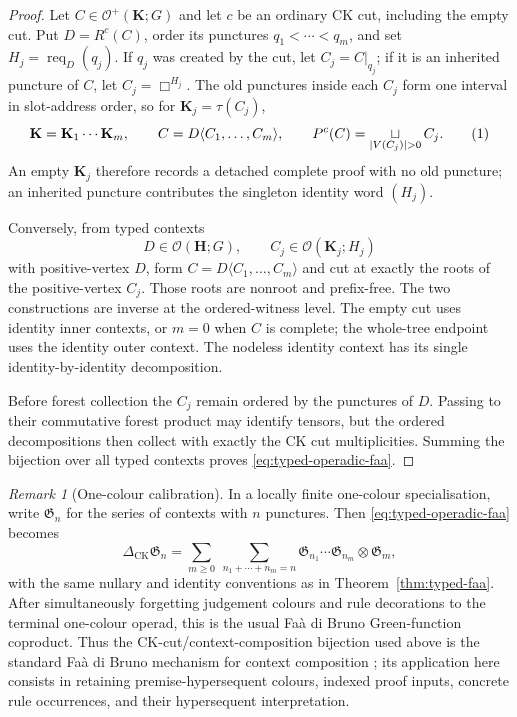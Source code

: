 \documentclass[10pt,a4paper]{article}
\theoremstyle{plain}
\theoremstyle{definition}
\theoremstyle{remark}
\newtheorem{remark}[theorem]{Remark}
\newcommand{\DeltaCK}{\Delta_{\mathrm{CK}}}
\newcommand{\fjoin}{\mathbin{\sqcup}}
\newcommand{\Req}{\operatorname{req}}
\newcommand{\eqtag}{\refstepcounter{equation}\tag{\theequation}}
\begin{document}
\begin{proof}
Let \(C\in\mathcal O^+(\mathbf K;G)\) and let \(c\) be an ordinary CK
cut, including the empty cut.  Put \(D=R^c(C)\), order its
punctures \(q_1<\cdots<q_m\), and set
\(
H_j=\Req_D(q_j)
\).
If \(q_j\) was created by the cut, let \(C_j=C|_{q_j}\); if it is an
inherited puncture of \(C\), let \(C_j=\Box^{H_j}\).  The old punctures
inside each \(C_j\) form one interval in slot-address order, so for
\(\mathbf K_j=\tau(C_j)\),
\[
 \mathbf K=\mathbf K_1\cdots\mathbf K_m,\qquad
 C=D\langle C_1,\ldots,C_m\rangle,\qquad
 P^c(C)=\mathop{\fjoin}_{|V(C_j)|>0}C_j .
\eqtag\label{eq:typed-faa-cut-data}
\]
An empty \(\mathbf K_j\) therefore records a detached complete proof with
no old puncture; an inherited puncture contributes the singleton identity
word \((H_j)\).

Conversely, from typed contexts
\[
 D\in\mathcal O(\mathbf H;G),\qquad
 C_j\in\mathcal O(\mathbf K_j;H_j)
\]
with positive-vertex \(D\), form
\(C=D\langle C_1,\ldots,C_m\rangle\) and cut at exactly the roots of the
positive-vertex \(C_j\).  Those roots are nonroot and prefix-free.  The two
constructions are inverse at the ordered-witness level.  The empty cut
uses identity inner contexts, or \(m=0\) when \(C\) is complete; the
whole-tree endpoint uses the identity outer context.  The nodeless
identity context has its single identity-by-identity decomposition.

Before forest collection the \(C_j\) remain ordered by the punctures of
\(D\).  Passing to their commutative forest product may identify tensors,
but the ordered decompositions then collect with exactly the CK cut
multiplicities.  Summing the bijection over all typed contexts proves
\eqref{eq:typed-operadic-faa}.
\end{proof}

\begin{remark}[One-colour calibration]
\label{cor:one-colour-faa}
In a locally finite one-colour specialisation, write
\(\mathfrak G_n\) for the series of contexts with \(n\) punctures.  Then
\eqref{eq:typed-operadic-faa} becomes
\[
 \DeltaCK\mathfrak G_n
 =
 \sum_{m\ge0}\ 
 \sum_{n_1+\cdots+n_m=n}
 \mathfrak G_{n_1}\cdots\mathfrak G_{n_m}
 \otimes\mathfrak G_m ,
\]
with the same nullary and identity conventions as in
Theorem~\ref{thm:typed-faa}.  After simultaneously forgetting judgement
colours and rule decorations to the terminal one-colour operad, this is
the usual Fa\`a di Bruno Green-function coproduct.  Thus the
CK-cut/context-composition bijection used above is the standard Fa\`a di Bruno
mechanism for context composition
\cite{galvezkocktonks2014,kockweber2019}; its application here consists
in retaining premise-hypersequent colours, indexed proof inputs, concrete
rule occurrences, and their hypersequent interpretation.
\end{remark}
\end{document}
